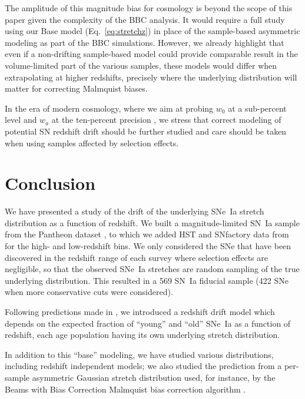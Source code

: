 \documentclass[]{aa}
\begin{document}
The amplitude of this magnitude bias for cosmology is beyond the scope of this
paper given the complexity of the BBC analysis. It would require a full study
using our Base model (Eq.~\ref{eq:stretchz}) in place of the sample-based
asymmetric modeling as part of the BBC simulations. However, we already
highlight that even if a non-drifting sample-based model could provide
comparable result in the volume-limited part of the various samples, these
models would differ when extrapolating at higher redshifts, precisely where the
underlying distribution will matter for correcting Malmquist biases.

In the era of modern cosmology, where we aim at probing $w_0$ at a sub-percent
level and $w_a$ at the ten-percent precision \citep[e.g.,][]{lsstpaper}, we
stress that correct modeling of potential SN redshift drift should be further
studied and care should be taken when using samples affected by selection
effects.

\section{Conclusion}\label{sec:ccl}

We have presented a study of the drift of the underlying SNe~Ia stretch
distribution as a function of redshift. We built a magnitude-limited SN~Ia
sample from the Pantheon dataset \citep[][SDSS, PS1 and SNLS]{scolnic2018a}, to
which we added HST and SNfactory data from \cite{rigault2018} for the high- and
low-redshift bins. We only considered the SNe that have been discovered in the
redshift range of each survey where selection effects are negligible, so that
the observed SNe~Ia stretches are random sampling of the true underlying
distribution. This resulted in a 569 SN~Ia fiducial sample (422 SNe when more
conservative cuts were considered).

Following predictions made in \cite{rigault2018}, we introduced a redshift drift
model which depends on the expected fraction of ``young'' and ``old'' SNe~Ia as
a function of redshift, each age population having its own underlying
stretch distribution.

In addition to this ``base'' modeling, we have studied various distributions,
including redshift independent models; we also studied the prediction from a per-sample asymmetric Gaussian stretch distribution used, for instance, by the Beams with Bias Correction Malmquist bias correction algorithm \citep{scolnic2016, kessler2017}.
\end{document}
